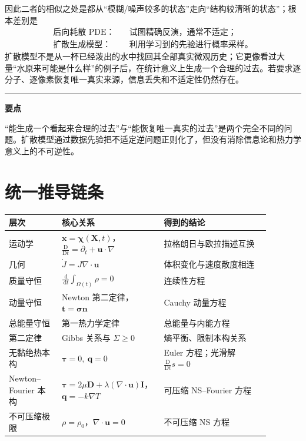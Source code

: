 \documentclass[cn,hazy,blue,11pt,normal]{elegantnote}
\numberwithin{equation}{section}
\newcommand{\dd}{\,\mathrm d}
\newcommand{\Dt}{\frac{\mathrm D}{\mathrm Dt}}
\newcommand{\vct}[1]{\bm{#1}}
\newcommand{\ten}[1]{\bm{#1}}
\newenvironment{keypoint}{%
  \par\medskip\noindent\color{blue!60!black}\rule{0.8em}{0.8em}\quad
  \begin{minipage}{0.91\linewidth}\color{black}\textbf{要点}\quad
}{\end{minipage}\par\medskip}
\begin{document}
因此二者的相似之处是都从“模糊/噪声较多的状态”走向“结构较清晰的状态”；根本差别是
\begin{equation}
 \boxed{
 \begin{aligned}
 \text{后向耗散 PDE：}&\quad\text{试图精确反演，通常不适定；}\\
 \text{扩散生成模型：}&\quad\text{利用学习到的先验进行概率采样。}
 \end{aligned}}
\end{equation}
扩散模型不是从一杯已经泼出的水中找回其全部真实微观历史；它更像看过大量“水原来可能是什么样”的例子后，在统计意义上生成一个合理的过去。若要求逐分子、逐像素恢复唯一真实来源，信息丢失和不适定性仍然存在。

\begin{keypoint}
“能生成一个看起来合理的过去”与“能恢复唯一真实的过去”是两个完全不同的问题。扩散模型通过数据先验把不适定逆问题正则化了，但没有消除信息论和热力学意义上的不可逆性。
\end{keypoint}

\section{统一推导链条}

\begin{center}
\renewcommand{\arraystretch}{1.35}
\begin{tabular}{>{\raggedright\arraybackslash}p{0.18\linewidth}
                >{\raggedright\arraybackslash}p{0.34\linewidth}
                >{\raggedright\arraybackslash}p{0.36\linewidth}}
\toprule
层次 & 核心关系 & 得到的结论 \\
\midrule
运动学 & $\vct x=\vct\chi(\vct X,t)$，$\Dt=\partial_t+\vct u\cdot\nabla$ & 拉格朗日与欧拉描述互换 \\
几何 & $\dot J=J\nabla\cdot\vct u$ & 体积变化与速度散度相连 \\
质量守恒 & $\frac{\dd}{\dd t}\int_{\Omega(t)}\rho=0$ & 连续性方程 \\
动量守恒 & Newton 第二定律，$\vct t=\ten\sigma\vct n$ & Cauchy 动量方程 \\
总能量守恒 & 第一热力学定律 & 总能量与内能方程 \\
第二定律 & Gibbs 关系与 $\Sigma\ge0$ & 熵平衡、限制本构关系 \\
无黏绝热本构 & $\ten\tau=0,\ \vct q=0$ & Euler 方程；光滑解 $\Dt s=0$ \\
Newton--Fourier 本构 & $\ten\tau=2\mu\ten D+\lambda(\nabla\cdot\vct u)\ten I$，$\vct q=-k\nabla T$ & 可压缩 NS--Fourier 方程 \\
不可压缩极限 & $\rho=\rho_0$，$\nabla\cdot\vct u=0$ & 不可压缩 NS 方程 \\
\bottomrule
\end{tabular}
\end{center}
\end{document}
